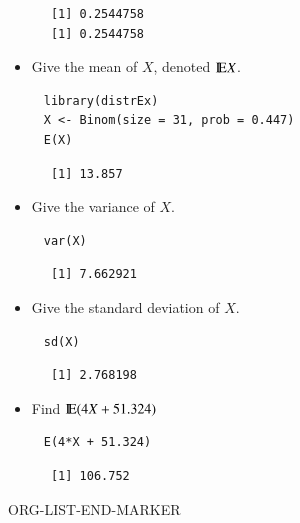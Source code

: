 \documentclass[captions=tableheading]{scrbook}
\begin{document}
\begin{xca}
\begin{verbatim}
      [1] 0.2544758
      [1] 0.2544758
\end{verbatim}

\begin{itemize}
\item Give the mean of \(X\), denoted \(\mathrm{I\hspace{-1.5pt}E} X\).
\end{itemize}

\begin{verbatim}
     library(distrEx)
     X <- Binom(size = 31, prob = 0.447)
     E(X)
\end{verbatim}

\begin{verbatim}
      [1] 13.857
\end{verbatim}

\begin{itemize}
\item Give the variance of \(X\).
\end{itemize}

\begin{verbatim}
     var(X)
\end{verbatim}

\begin{verbatim}
      [1] 7.662921
\end{verbatim}

\begin{itemize}
\item Give the standard deviation of \(X\).
\end{itemize}

\begin{verbatim}
     sd(X)
\end{verbatim}

\begin{verbatim}
      [1] 2.768198
\end{verbatim}

\begin{itemize}
\item Find \(\mathrm{I\hspace{-1.5pt}E}(4X+51.324)\)
\end{itemize}

\begin{verbatim}
     E(4*X + 51.324)
\end{verbatim}

\begin{verbatim}
      [1] 106.752
\end{verbatim}

ORG-LIST-END-MARKER
\end{xca}
\end{document}
